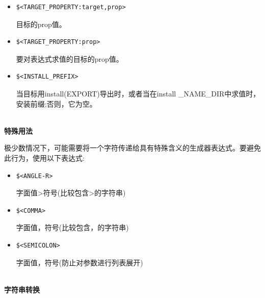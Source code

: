 \begin{itemize}
\item 
\begin{lstlisting}[style=styleCMake]
$<TARGET_PROPERTY:target,prop>
\end{lstlisting}

目标的prop值。

\item 
\begin{lstlisting}[style=styleCMake]
$<TARGET_PROPERTY:prop>
\end{lstlisting}

要对表达式求值的目标的prop值。

\item 
\begin{lstlisting}[style=styleCMake]
$<INSTALL_PREFIX> 
\end{lstlisting}

当目标用install(EXPORT)导出时，或者当在install \_NAME\_DIR中求值时，安装前缀;否则，它为空。

\end{itemize}

\hspace*{\fill} \\ %
\noindent
\textbf{特殊用法}

极少数情况下，可能需要将一个字符传递给具有特殊含义的生成器表达式。要避免此行为，使用以下表达式:

\begin{itemize}
\item 
\begin{lstlisting}[style=styleCMake]
$<ANGLE-R>
\end{lstlisting}

字面值>符号(比较包含>的字符串)

\item 
\begin{lstlisting}[style=styleCMake]
$<COMMA>
\end{lstlisting}

字面值，符号(比较包含，的字符串)

\item 
\begin{lstlisting}[style=styleCMake]
$<SEMICOLON>
\end{lstlisting}

字面值，符号(防止对参数进行列表展开)
\end{itemize}

\hspace*{\fill} \\ %
\noindent
\textbf{字符串转换}


